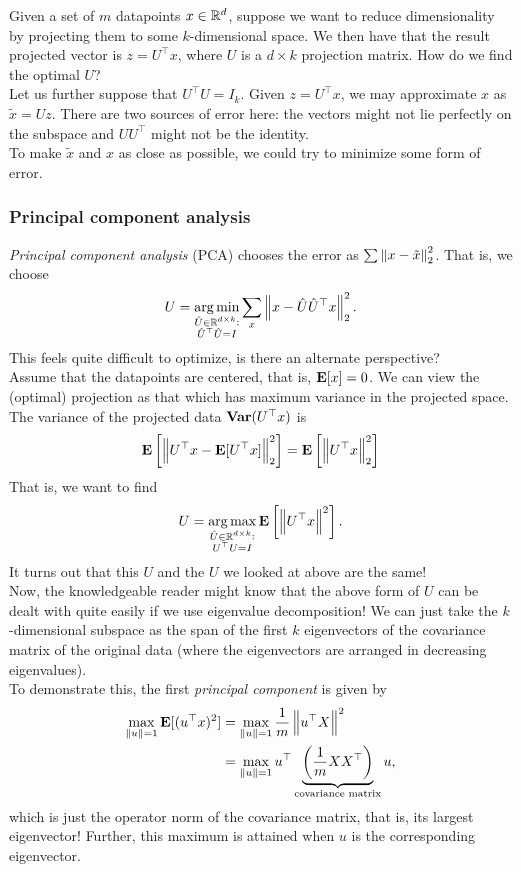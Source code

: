 \documentclass{article}
\begin{document}
		Given a set of $m$ datapoints $x\in\mathbb{R}^d$, suppose we want to reduce dimensionality by projecting them to some $k$-dimensional space. We then have that the result projected vector is $z = U^\top x$, where $U$ is a $d\times k$ projection matrix. How do we find the optimal $U$?\\
		Let us further suppose that $U^\top U = I_k$. Given $z = U^\top x$, we may approximate $x$ as $\tilde{x} = U z$. There are two sources of error here: the vectors might not lie perfectly on the subspace and $UU^\top$ might not be the identity.\\
		To make $\tilde{x}$ and $x$ as close as possible, we could try to minimize some form of error.

		\subsubsection{Principal component analysis}

			\emph{Principal component analysis} (PCA) chooses the error as $\sum \left\lVert x - \tilde{x}\right\rVert_2^2$. That is, we choose
			\[ U = \operatorname*{arg\,min}_{\substack{\hat{U} \in \mathbb{R}^{d\times k} : \\ \hat{U}^\top\hat{U} = I}} \sum_x \left\lVert x - \hat{U}\hat{U}^\top x \right\rVert_2^2. \]
			This feels quite difficult to optimize, is there an alternate perspective?\\
			Assume that the datapoints are centered, that is, $\textbf{E}[x] = 0$. We can view the (optimal) projection as that which has maximum variance in the projected space. The variance of the projected data $\operatorname{\textbf{Var}}(U^\top x)$ is
			\[ \textbf{E}\left[\left\lVert U^\top x - \textbf{E}[U^\top x] \right\rVert_2^2\right] = \textbf{E}\left[\left\lVert U^\top x\right\rVert_2^2\right] \]
			That is, we want to find
			\[ U = \operatorname*{arg\,max}_{\substack{\hat{U} \in \mathbb{R}^{d\times k} : \\ U^\top U = I}} \textbf{E}\left[\left\lVert U^\top x\right\rVert^2\right]. \]
			It turns out that this $U$ and the $U$ we looked at above are the same!\\

			Now, the knowledgeable reader might know that the above form of $U$ can be dealt with quite easily if we use eigenvalue decomposition! We can just take the $k$-dimensional subspace  as the span of the first $k$ eigenvectors of the covariance matrix of the original data (where the eigenvectors are arranged in decreasing eigenvalues).\\
			To demonstrate this, the first \emph{principal component} is given by
			\begin{align*}
				\max_{\left\lVert u\right\rVert = 1} \textbf{E}[(u^\top x)^2] &= \max_{\left\lVert u\right\rVert = 1} \frac{1}{m} \left\lVert u^\top X\right\rVert^2 \\
					&= \max_{\left\lVert u\right\rVert = 1} u^\top \underbrace{\left( \frac{1}{m} X X^\top \right)}_{\text{covariance matrix}} u,
			\end{align*}
			which is just the operator norm of the covariance matrix, that is, its largest eigenvector! Further, this maximum is attained when $u$ is the corresponding eigenvector.\\
\end{document}
